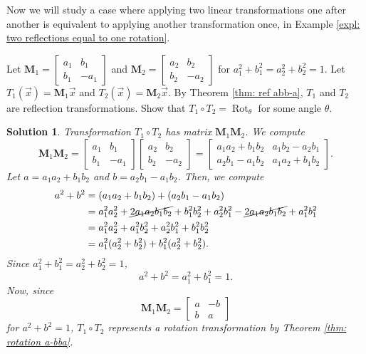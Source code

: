 \documentclass[]{book}
\DeclareMathOperator{\rotation}{Rot}
\newcommand{\mat}[1]{\ensuremath{\mathbf{#1}}}
\newtheorem*{solution}{Solution}
\begin{document}
Now we will study a case where applying two linear transformations one after another is equivalent to applying another transformation once, in Example \ref{expl: two reflections equal to one rotation}.
\begin{example}
    \label{expl: two reflections equal to one rotation}
    Let $\mat{M}_1 = \begin{bmatrix}a_1 & b_1 \\ b_1 & -a_1\end{bmatrix}$ and $\mat{M}_2 = \begin{bmatrix}a_2 & b_2 \\ b_2 & -a_2\end{bmatrix}$ for $a_1^2 + b_1^2 = a_2^2 + b_2^2 = 1$. Let $T_1(\vec{x}) = \mat{M}_1 \vec{x}$ and $T_2(\vec{x}) = \mat{M}_2\vec{x}$. By Theorem \ref{thm: ref abb-a}, $T_1$ and $T_2$ are reflection transformations. Show that $T_1 \circ T_2 = \rotation_{\theta}$ for some angle $\theta$.
\begin{solution}
    Transformation $T_1 \circ T_2$ has matrix $\mat{M}_1\mat{M}_2$. We compute
    \[
        \mat{M}_1\mat{M}_2 = \begin{bmatrix}a_1 & b_1 \\ b_1 & -a_1\end{bmatrix}\begin{bmatrix}a_2 & b_2 \\ b_2 & -a_2\end{bmatrix}
        = \begin{bmatrix}a_1a_2 + b_1b_2 & a_1b_2 - a_2b_1 \\ a_2b_1 - a_1b_2 & a_1a_2 + b_1b_2\end{bmatrix}.
    \]
    Let $a = a_1a_2 + b_1b_2$ and $b = a_2b_1 - a_1b_2$. Then, we compute
    \begin{align*}
        a^2 + b^2 &= (a_1a_2 + b_1b_2) + (a_2b_1 - a_1b_2) \\
        &= a_1^2a_2^2 + \cancel{2a_1a_2b_1b_2} + b_1^2b_2^2 + a_2^2b_1^2 - \cancel{ 2a_1a_2b_1b_2} + a_1^2b_1^2 \\
        &= a_1^2a_2^2 + a_1^2b_2^2 + a_2^2b_1^2 + b_1^2b_2^2\\
        &= a_1^2 (a_2^2 + b_2^2) + b_1^2(a_2^2 + b_2^2).
    \end{align*}
    Since $a_1^2 + b_1^2 = a_2^2 + b_2^2 = 1$, 
    \[a^2 + b^2 = a_1^2 + b_1^2 = 1.\]
    Now, since
    \[\mat{M}_1\mat{M}_2 = \begin{bmatrix} a & -b \\ b & a \end{bmatrix}\] for $a^2 + b^2 = 1$, $T_1 \circ T_2$ represents a rotation transformation by Theorem \ref{thm: rotation a-bba}. \hfill \qedsymbol
\end{solution}
\end{example}
\end{document}
